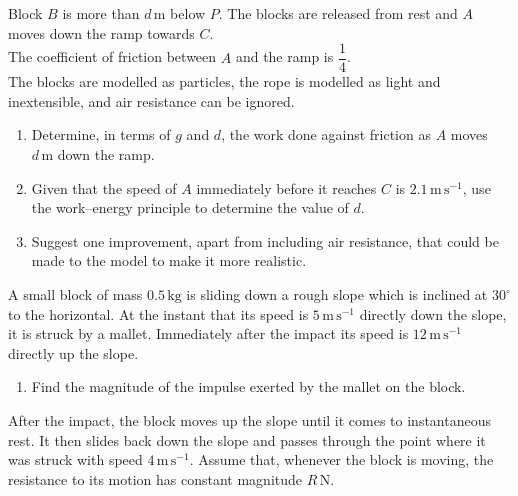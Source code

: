 \documentclass[leqno]{article}
\begin{document}
\begin{enumerate}[
  label=\textbf{\arabic*.},
  leftmargin=*,
  topsep=0pt,
  partopsep=0pt,
  parsep=0pt
]
Block $B$ is more than $d\,\mathrm{m}$ below $P$. The blocks are released from rest and $A$ moves down the ramp towards $C$. \\

The coefficient of friction between $A$ and the ramp is $\dfrac{1}{4}$. \\

The blocks are modelled as particles, the rope is modelled as light and inextensible, and air resistance can be ignored. \\

\begin{enumerate}[label=\textbf{(\alph*)}]
  \item Determine, in terms of $g$ and $d$, the work done against friction as $A$ moves $d\,\mathrm{m}$ down the ramp.  \\
  \item Given that the speed of $A$ immediately before it reaches $C$ is $2.1\,\mathrm{m\,s^{-1}}$, use the work--energy principle to determine the value of $d$.  \\
  \item Suggest one improvement, apart from including air resistance, that could be made to the model to make it more realistic.  \\
\end{enumerate}

\newpage

\questionitem

A small block of mass $0.5\,\mathrm{kg}$ is sliding down a rough slope which is inclined at $30^\circ$ to the horizontal. At the instant that its speed is $5\,\mathrm{m\,s^{-1}}$ directly down the slope, it is struck by a mallet. Immediately after the impact its speed is $12\,\mathrm{m\,s^{-1}}$ directly up the slope. \\

\begin{enumerate}[label=\textbf{(\alph*)}]
  \item Find the magnitude of the impulse exerted by the mallet on the block.  \\
\end{enumerate}

After the impact, the block moves up the slope until it comes to instantaneous rest. It then slides back down the slope and passes through the point where it was struck with speed $4\,\mathrm{m\,s^{-1}}$. Assume that, whenever the block is moving, the resistance to its motion has constant magnitude $R\,\mathrm{N}$. \\


\end{enumerate}
\end{document}
